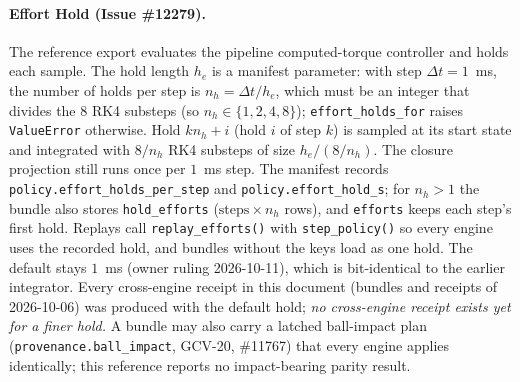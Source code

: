 \documentclass[11pt,a4paper]{article}
\begin{document}
\paragraph{Effort Hold (Issue \#12279).}  The reference export evaluates the
pipeline computed-torque controller and holds each sample.  The hold length
$h_e$ is a manifest parameter: with step $\Delta t=1$~ms, the number of holds
per step is $n_h=\Delta t/h_e$, which must be an integer that divides the $8$
RK4 substeps (so $n_h\in\{1,2,4,8\}$); \texttt{effort\_holds\_for} raises
\texttt{ValueError} otherwise.  Hold $kn_h+i$ (hold $i$ of step $k$) is
sampled at its start state and integrated with $8/n_h$ RK4 substeps of size
$h_e/(8/n_h)$.  The closure projection still runs once per $1$~ms step.  The
manifest records \texttt{policy.effort\_holds\_per\_step} and
\texttt{policy.effort\_hold\_s}; for $n_h>1$ the bundle also stores
\texttt{hold\_efforts} ($\text{steps}\times n_h$ rows), and \texttt{efforts}
keeps each step's first hold.  Replays call \texttt{replay\_efforts()} with
\texttt{step\_policy()} so every engine uses the recorded hold, and bundles
without the keys load as one hold.  The default stays $1$~ms (owner ruling
2026-10-11), which is bit-identical to the earlier integrator.  Every
cross-engine receipt in this document (bundles and receipts of 2026-10-06) was
produced with the default hold; \emph{no cross-engine receipt exists yet for a
finer hold.}  A bundle may also carry a latched ball-impact plan
(\texttt{provenance.ball\_impact}, GCV-20, \#11767) that every engine applies
identically; this reference reports no impact-bearing parity result.
\end{document}
